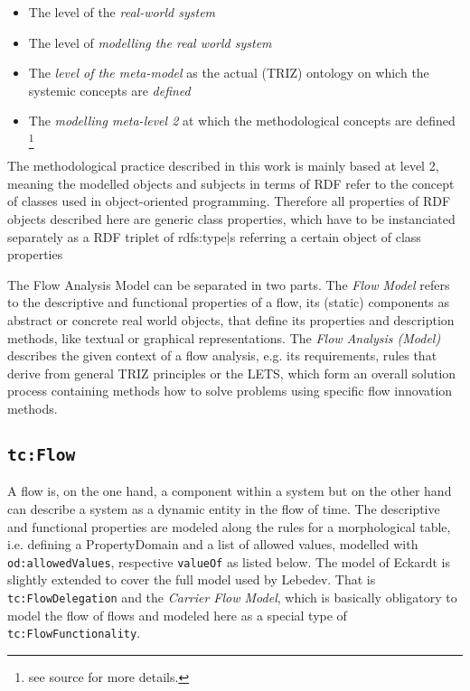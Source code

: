 \documentclass[a4paper,11pt]{article}
\begin{document}
    \begin{itemize}
        \item[0.] The level of the \emph{real-world system} 
        \item[1.] The level of \emph{modelling the real world system} 
        \item[2.] The \emph{level of the meta-model} as the actual (TRIZ) ontology
        on which the systemic concepts are \emph{defined} 
        \item[3.] The \emph{modelling meta-level 2} at which the methodological
        concepts are defined \cite{Graebe2021} 
        \footnote{see source for more details.} 
    \end{itemize}


    The methodological practice described in this work is mainly based at 
    level 2, meaning the modelled objects and subjects in terms of RDF refer to
    the concept of classes used in object-oriented programming. 
    Therefore all properties of RDF objects described here are generic class
    properties, which have to be instanciated separately as a RDF triplet of 
    rdfs:type|s referring a certain object of class properties

    The Flow Analysis Model can be separated in two parts. The 
    \emph{Flow Model} refers to the descriptive and functional properties
    of a flow, its (static) components as abstract or concrete real world 
    objects, that define its properties and description methods, like
    textual or graphical representations. The \emph{Flow Analysis (Model)}
    describes the given context of a flow analysis, e.g. its requirements,
    rules that derive from general TRIZ principles or the LETS, which form
    an overall solution process containing methods how to solve problems using 
    specific flow innovation methods. 

    \subsection{\texttt{tc:Flow}}

    A flow is, on the one hand, a component within a system but on the other 
    hand can describe a system as a dynamic entity in the flow of time. The 
    descriptive and functional properties are modeled along the rules for a 
    morphological table, i.e. defining a PropertyDomain and a list of allowed 
    values, modelled with \texttt{od:allowedValues}, respective \texttt{valueOf} 
    as listed below. The model of Eckardt is slightly extended to cover the 
    full model used by Lebedev. That is \texttt{tc:FlowDelegation} and the
    \emph{Carrier Flow Model}, which is basically obligatory to model the flow 
    of flows and modeled here as a special type of \texttt{tc:FlowFunctionality}.
\end{document}
